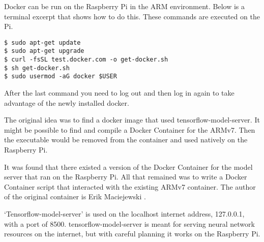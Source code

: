 Docker can be run on the Raspberry Pi in the ARM environment. Below is a terminal excerpt that shows how to do this. These commands are executed on the Pi.

\begin{verbatim}
$ sudo apt-get update
$ sudo apt-get upgrade
$ curl -fsSL test.docker.com -o get-docker.sh 
$ sh get-docker.sh
$ sudo usermod -aG docker $USER
\end{verbatim}

After the last command you need to log out and then log in again to take advantage of the newly installed docker.

The original idea was to find a docker image that used tensorflow-model-server. It might be possible to find and compile a Docker Container for the ARMv7. Then the executable would be removed from the container and used natively on the Raspberry Pi. 

It was found that there existed a version of the Docker Container for the model server that ran on the Raspberry Pi. All that remained was to write a Docker Container script that interacted with the existing ARMv7 container. The author of the original container is Erik Maciejewski \cite{2020Maciejewski}.

`Tensorflow-model-server' is used on the localhost internet address, 127.0.0.1, with a port of 8500. tensorflow-model-server is meant for serving neural network resources on the internet, but with careful planning it works on the Raspberry Pi.

